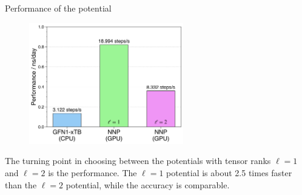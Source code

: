 \documentclass[11pt,t]{beamer}
\begin{document}
\begin{frame}{Performance of the potential}
	\vspace{-10pt}
	\begin{figure}
		\centering
		\includegraphics[width=0.6\textwidth]{Figures/results_performance_comparison.png}
	\end{figure}
	\small
	The turning point in choosing between the potentials with tensor ranks $\ell = 1$ and $\ell = 2$ is the performance. The $\ell = 1$ potential is about 2.5 times faster than the $\ell = 2$ potential, while the accuracy is comparable.
\end{frame}
\end{document}
